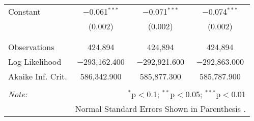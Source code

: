 \documentclass[12pt,twoside]{reedthesis}
\begin{document}
\begin{table}[!htbp]
\begin{tabular}{@{\extracolsep{5pt}}lccc}
   Constant & $-$0.061$^{***}$ & $-$0.071$^{***}$ & $-$0.074$^{***}$ \\ 
    & (0.002) & (0.002) & (0.002) \\ 
    & & & \\ 
  \hline \\[-1.8ex] 
  Observations & 424,894 & 424,894 & 424,894 \\ 
  Log Likelihood & $-$293,162.400 & $-$292,921.600 & $-$292,863.000 \\ 
  Akaike Inf. Crit. & 586,342.900 & 585,877.300 & 585,787.900 \\ 
  \hline 
  \hline \\[-1.8ex] 
  \textit{Note:}  & \multicolumn{3}{r}{$^{*}$p$<$0.1; $^{**}$p$<$0.05; $^{***}$p$<$0.01} \\ 
   & \multicolumn{3}{r}{Normal Standard Errors Shown in Parenthesis .} \\ 
  \end{tabular} 
  \end{table}
  
\end{document}
